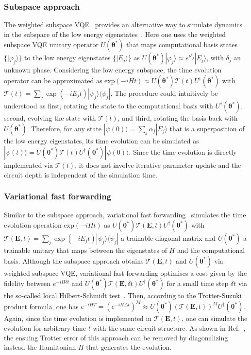 \documentclass[prx,twocolumn,floatfix,superscriptaddress,longbibliography]{revtex4-1}
\renewcommand{\vec}[1]{\boldsymbol{#1}}  %
\newcommand{\<}{\langle}
\renewcommand{\>}{\rangle}
\newcommand{\ket}[1]{|#1\rangle}               %
\newcommand{\bra}[1]{\langle #1|}              %
\renewcommand{\vec}[1]{\boldsymbol{#1}}  %
\begin{document}
\subsubsection{ Subspace approach} The weighted subspace VQE~\cite{nakanishi2019subspace} provides an alternative way to simulate dynamics in the subspace of the low energy eigenstates~\cite{heya2019subspace}. 
Here one uses the weighted subspace VQE unitary operator $U(\vec{\theta}^*)$ that maps computational basis states $\{\ket{\varphi_j}\}$ to the low energy eigenstates $\{\ket{E_j}\}$ as $U(\vec{\theta}^*) \ket{\varphi_j}\approx e^{i \delta_j} \ket{E_j}$, with $\delta_j$ an unknown phase. 
Considering the low energy subspace, the time evolution operator can be approximated as $\mathrm{exp}(-i H t) \approx U(\vec{\theta}^*) \mathcal T(t) U^\dag(\vec{\theta}^*)$ with $\mathcal T(t)=\sum_{j} \exp(-iE_j t)\ket{\psi_j}\bra{\psi_j}$. The procedure could intuitively be understood as first, rotating the state to the computational basis with $U^\dag(\vec{\theta}^*)$, second, evolving  the state with $\mathcal T(t)$, and third, rotating the basis back with $U(\vec{\theta}^*)$. 
Therefore, for any state $\ket{\psi(0)}=\sum_j \alpha_j \ket{E_j}$ that is a superposition of the low energy eigenstates, its time evolution can be simulated as $\ket{\psi(t)}=U(\vec{\theta}^*) \mathcal T(t) U^\dag(\vec{\theta}^*)\ket{\psi(0)}$. Since the time evolution is directly implemented via $\mathcal T(t)$, it does not involve iterative parameter update and the circuit depth is independent of the simulation time. 



\subsubsection{ Variational fast forwarding} Similar to the subspace approach, variational fast forwarding~\cite{cirstoiu2019variational,gibbs2021long} simulates the time evolution operation $\mathrm{exp}(-i H t)$ as $U(\vec{\theta}^*) \mathcal T(\vec E, t) U^\dag(\vec{\theta}^*)$ with  $\mathcal T(\vec E, t)=\sum_{j} \exp(-iE_j t)\ket{\psi_j}\bra{\psi_j}$ a trainable diagonal matrix  and  $U(\vec{\theta}^*)$ a trainable unitary that maps between the eigenstates of $H$ and the computational basis. Although the subspace approach obtains $\mathcal T(\vec E, t)$ and $U(\vec{\theta}^*)$ via weighted subspace VQE, variational fast forwarding optimises a cost given by the fidelity between $e^{-iH \delta t}$ and $U(\vec{\theta}^*) \mathcal T(\vec E, \delta t) U^\dag(\vec{\theta}^*)$ for a small time step $\delta t$ via the so-called local Hilbert-Schmidt test~\cite{QAQC}. 
Then, according to the Trotter-Suzuki product formula, one has $e^{-iH T} = (e^{-iH \Delta t})^M \approx U(\vec{\theta}^*)( \mathcal T(\vec E, t))^M U^\dag(\vec{\theta}^*)$. Again, since the time evolution is implemented in $\mathcal T(\vec E, t)$, one can simulate the evolution for arbitrary time $t$ with the same circuit structure. As shown in Ref.~\cite{commeau2020variational}, the ensuing Trotter error of this approach can be removed by diagonalizing instead the Hamiltonian $H$ that generates the evolution.
\end{document}
